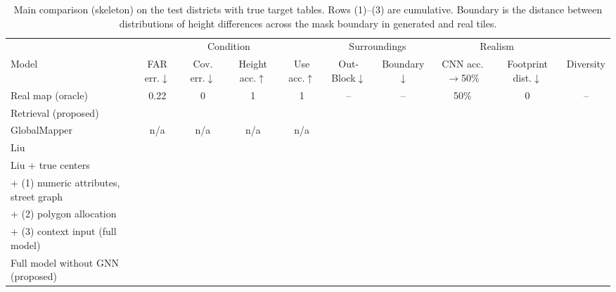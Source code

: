 \documentclass[twocolumn,11pt]{article}
\begin{document}
\begin{table}[t]
\centering\small
\begin{tabular}{l|cccc|cc|cc|c}
\toprule
& \multicolumn{4}{c|}{Condition} & \multicolumn{2}{c|}{Surroundings} & \multicolumn{2}{c|}{Realism} & \\
Model & FAR err.$\downarrow$ & Cov. err.$\downarrow$ & Height acc.$\uparrow$ & Use acc.$\uparrow$ & Out-Block$\downarrow$ & Boundary$\downarrow$ & CNN acc.$\to$50\% & Footprint dist.$\downarrow$ & Diversity \\
\midrule
Real map (oracle) & 0.22 & 0 & 1 & 1 & -- & -- & 50\% & 0 & -- \\
Retrieval (proposed) & & & & & & & & & \\
GlobalMapper & n/a & n/a & n/a & n/a & & & & & \\
Liu & & & & & & & & & \\
Liu + true centers & & & & & & & & & \\
\quad + (1) numeric attributes, street graph & & & & & & & & & \\
\quad + (2) polygon allocation & & & & & & & & & \\
\quad + (3) context input (full model) & & & & & & & & & \\
Full model without GNN (proposed) & & & & & & & & & \\
\bottomrule
\end{tabular}
\caption{Main comparison (skeleton) on the test districts with true target tables. Rows (1)--(3) are cumulative. Boundary is the distance between distributions of height differences across the mask boundary in generated and real tiles.}
\label{tab:main}
\end{table}
\end{document}
